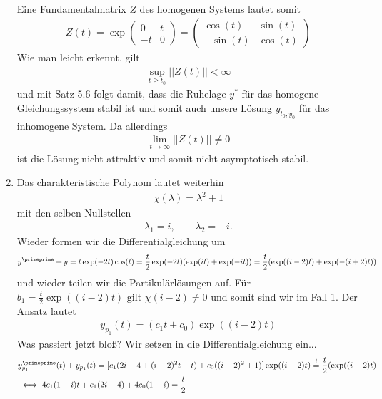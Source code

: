 \begin{solution}
\begin{enumerate}[label = \textbf{\alph*)}]
\begin{align*}
  \end{align*}
  Eine Fundamentalmatrix $Z$ des homogenen Systems lautet somit
  \begin{align*}
    Z(t) = \exp\begin{pmatrix}
      0 & t \\ -t & 0
    \end{pmatrix} = \begin{pmatrix}
      \cos(t) & \sin(t) \\ -\sin(t) & \cos(t)
    \end{pmatrix}
  \end{align*}
  Wie man leicht erkennt, gilt
  \begin{align*}
    \sup_{t \geq t_0} ||Z(t)|| < \infty
  \end{align*}
  und mit Satz 5.6 folgt damit, dass die Ruhelage $y^*$ für das homogene Gleichungssystem
  stabil ist und somit auch unsere Lösung $y_{t_0,y_0}$ für das inhomogene System.
  Da allerdings
  \begin{align*}
    \lim_{t \rightarrow \infty} ||Z(t)|| \neq 0
  \end{align*}
  ist die Lösung nicht attraktiv und somit nicht asymptotisch stabil.
  \item Das charakteristische Polynom lautet weiterhin
  \begin{align*}
    \chi(\lambda) = \lambda^2 + 1
  \end{align*}
  mit den selben Nullstellen
  \begin{align*}
    \lambda_1 = i, \qquad \lambda_2 = -i.
  \end{align*}
  Wieder formen wir die Differentialgleichung um
  \begin{align*}
    y^{\primeprime} + y = t\exp(-2t)\cos(t) = \frac{t}{2}\exp(-2t)(\exp(it) + \exp(-it))
    = \frac{t}{2}(\exp((i-2)t) + \exp(-(i+2)t))
  \end{align*}
  und wieder teilen wir die Partikulärlösungen auf. Für $b_{1} = \frac{t}{2}\exp((i-2)t)$
  gilt $\chi(i - 2) \neq 0$ und somit sind wir im Fall 1. Der Ansatz lautet
  \begin{align*}
    y_{p_1}(t) = (c_1t + c_0)\exp((i-2)t)
  \end{align*}
  Was passiert jetzt bloß? Wir setzen in die Differentialgleichung ein...
  \begin{align*}
    &y_{p_1}^{\primeprime}(t) + y_{p_1}(t) = [c_1(2i-4 + (i - 2)^2t + t) + c_0((i-2)^2 + 1)]\exp((i-2)t)
    \stackrel{!}{=} \frac{t}{2}(\exp((i-2)t) \\
    &\iff 4c_1(1-i)t + c_1(2i-4) + 4c_0(1 - i) = \frac{t}{2} \\

\end{align*}
\end{enumerate}
\end{solution}
